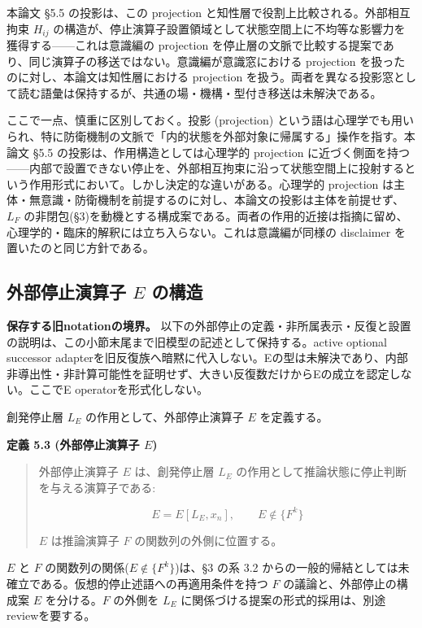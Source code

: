 本論文 \S{}5.5 の投影は、この projection と知性層で役割上比較される。外部相互拘束 $H_{ij}$ の構造が、停止演算子設置領域として状態空間上に不均等な影響力を獲得する——これは意識編の projection を停止層の文脈で比較する提案であり、同じ演算子の移送ではない。意識編が意識窓における projection を扱ったのに対し、本論文は知性層における projection を扱う。両者を異なる投影窓として読む語彙は保持するが、共通の場・機構・型付き移送は未解決である。

ここで一点、慎重に区別しておく。投影 (projection) という語は心理学でも用いられ、特に防衛機制の文脈で「内的状態を外部対象に帰属する」操作を指す。本論文 \S{}5.5 の投影は、作用構造としては心理学的 projection に近づく側面を持つ——内部で設置できない停止を、外部相互拘束に沿って状態空間上に投射するという作用形式において。しかし決定的な違いがある。心理学的 projection は主体・無意識・防衛機制を前提するのに対し、本論文の投影は主体を前提せず、$L_F$ の非閉包(\S{}3)を動機とする構成案である。両者の作用的近接は指摘に留め、心理学的・臨床的解釈には立ち入らない。これは意識編が同様の disclaimer を置いたのと同じ方針である。

\bigskip


\subsection{外部停止演算子 $E$ の構造}


\noindent\textbf{保存する旧notationの境界。} 以下の外部停止の定義・非所属表示・反復と設置の説明は、この小節末尾まで旧模型の記述として保持する。active optional successor adapterを旧反復族へ暗黙に代入しない。Eの型は未解決であり、内部非導出性・非計算可能性を証明せず、大きい反復数だけからEの成立を認定しない。ここでE operatorを形式化しない。

創発停止層 $L_E$ の作用として、外部停止演算子 $E$ を定義する。

\textbf{定義 5.3 (外部停止演算子 $E$)}

\begin{quote}
外部停止演算子 $E$ は、創発停止層 $L_E$ の作用として推論状態に停止判断を与える演算子である:

$$
E = E[L_E, x_n], \qquad E \notin \{F^k\}
$$

$E$ は推論演算子 $F$ の関数列の外側に位置する。
\end{quote}


$E$ と $F$ の関数列の関係($E \notin \{F^k\}$)は、\S{}3 の系 3.2 からの一般的帰結としては未確立である。仮想的停止述語への再適用条件を持つ $F$ の議論と、外部停止の構成案 $E$ を分ける。$F$ の外側を $L_E$ に関係づける提案の形式的採用は、別途reviewを要する。

